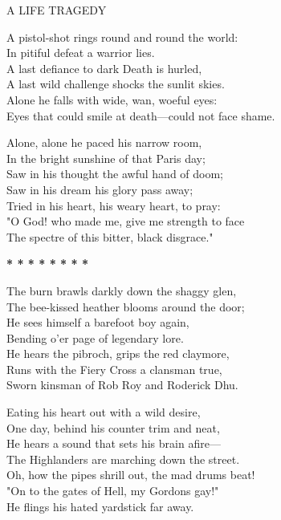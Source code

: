 \begin{poemblock}
 
A LIFE TRAGEDY

A pistol-shot rings round and round the world:\\
\hspace*{3em}In pitiful defeat a warrior lies.\\
A last defiance to dark Death is hurled,\\
\hspace*{3em}A last wild challenge shocks the sunlit skies.\\
\hspace*{3em}Alone he falls with wide, wan, woeful eyes:\\
Eyes that could smile at death—could not face shame.

Alone, alone he paced his narrow room,\\
\hspace*{3em}In the bright sunshine of that Paris day;\\
Saw in his thought the awful hand of doom;\\
\hspace*{3em}Saw in his dream his glory pass away;\\
\hspace*{3em}Tried in his heart, his weary heart, to pray:\\
"O God! who made me, give me strength to face\\
The spectre of this bitter, black disgrace."

\centerline{\textbf{*   *   *   *   *   *   *   *}}

The burn brawls darkly down the shaggy glen,\\
\hspace*{3em}The bee-kissed heather blooms around the door;\\
He sees himself a barefoot boy again,\\
\hspace*{3em}Bending o'er page of legendary lore.\\
\hspace*{3em}He hears the pibroch, grips the red claymore,\\
Runs with the Fiery Cross a clansman true,\\
Sworn kinsman of Rob Roy and Roderick Dhu.

Eating his heart out with a wild desire,\\
\hspace*{3em}One day, behind his counter trim and neat,\\
He hears a sound that sets his brain afire—\\
\hspace*{3em}The Highlanders are marching down the street.\\
\hspace*{3em}Oh, how the pipes shrill out, the mad drums beat!\\
"On to the gates of Hell, my Gordons gay!"\\
He flings his hated yardstick far away.


\end{poemblock}
